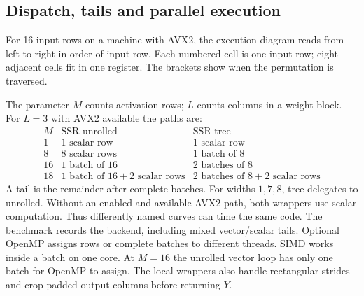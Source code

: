 \documentclass[11pt,a4paper]{article}
\begin{document}
\subsection{Dispatch, tails and parallel execution}
For 16 input rows on a machine with AVX2, the execution diagram reads
from left to right in order of input row. Each numbered cell is one input row; eight adjacent cells fit in one register. The brackets show when the permutation
is traversed.
\begin{center}
\end{center}

The parameter \(M\) counts activation rows; \(L\) counts columns in a weight
block. For \(L=3\) with AVX2 available the paths are:
\[
\begin{array}{c|l|l}
M&\text{SSR unrolled}&\text{SSR tree}\\\hline
1&1\text{ scalar row}&1\text{ scalar row}\\
8&8\text{ scalar rows}&1\text{ batch of }8\\
16&1\text{ batch of }16&2\text{ batches of }8\\
18&1\text{ batch of }16+2\text{ scalar rows}&
2\text{ batches of }8+2\text{ scalar rows}
\end{array}
\]
A tail is the remainder after complete batches. For widths \(1,7,8\), tree
delegates to unrolled. Without an enabled and available AVX2 path, both
wrappers use scalar computation. Thus differently named curves can time the
same code. The benchmark records the backend, including mixed vector/scalar
tails. Optional OpenMP assigns rows or complete batches to different threads.
SIMD works inside a batch on one core. At \(M=16\) the unrolled vector loop
has only one batch for OpenMP to assign. The local wrappers also handle
rectangular strides and crop padded output columns before returning \(Y\).
\end{document}
